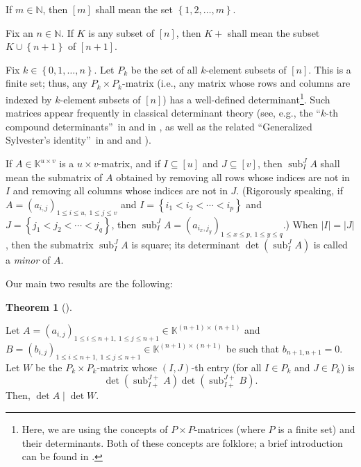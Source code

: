 \documentclass[numbers=enddot,12pt,final,onecolumn,notitlepage]{scrartcl}%
\theoremstyle{definition}
\newtheorem{theo}{Theorem}[section]
\newenvironment{theorem}[1][]
{\begin{theo}[#1]\begin{leftbar}}
{\end{leftbar}\end{theo}}
\begin{document}
If $m\in\mathbb{N}$, then $\left[  m\right]  $ shall mean the set $\left\{
1,2,\ldots,m\right\}  $.

Fix an $n\in\mathbb{N}$. If $K$ is any subset of $\left[  n\right]  $, then
$K+$ shall mean the subset $K\cup\left\{  n+1\right\}  $ of $\left[
n+1\right]  $.

Fix $k\in\left\{  0,1,\ldots,n\right\}  $. Let $P_{k}$ be the set of all
$k$-element subsets of $\left[  n\right]  $. This is a finite set; thus, any
$P_{k}\times P_{k}$-matrix (i.e., any matrix whose rows and columns are
indexed by $k$-element subsets of $\left[  n\right]  $) has a well-defined
determinant\footnote{Here, we are using the concepts of $P \times P$-matrices
(where $P$ is a finite set) and their determinants. Both of these concepts are
folklore; a brief introduction can be found in \cite[\S 1]{Grinbe18}.}. Such
matrices appear frequently in classical determinant theory (see, e.g., the
\textquotedblleft$k$-th compound determinants\textquotedblright\ in
\cite{MuiMet60} and in \cite[\S 2.6]{Prasolov}, as well as the related
\textquotedblleft Generalized Sylvester's identity\textquotedblright\ in
\cite[\S 2.7]{Prasolov} and \cite[Teorema 2.9.1]{Prasol15} and \cite{Mohr53}).

If $A\in\mathbb{K}^{u\times v}$ is a $u\times v$-matrix, and if $I\subseteq
\left[  u\right]  $ and $J\subseteq\left[  v\right]  $, then
$\operatorname*{sub}\nolimits_{I}^{J}A$ shall mean the submatrix of $A$
obtained by removing all rows whose indices are not in $I$ and removing all
columns whose indices are not in $J$. (Rigorously speaking, if $A=\left(
a_{i,j}\right)  _{1\leq i\leq u,\ 1\leq j\leq v}$ and $I=\left\{  i_{1}%
<i_{2}<\cdots<i_{p}\right\}  $ and $J=\left\{  j_{1}<j_{2}<\cdots
<j_{q}\right\}  $, then $\operatorname*{sub}\nolimits_{I}^{J}A=\left(
a_{i_{x},j_{y}}\right)  _{1\leq x\leq p,\ 1\leq y\leq q}$.) When $\left\vert
I\right\vert =\left\vert J\right\vert $, then the submatrix
$\operatorname*{sub}\nolimits_{I}^{J}A$ is square; its determinant
$\det\left(  \operatorname*{sub}\nolimits_{I}^{J}A\right)  $ is called a
\textit{minor} of $A$.

Our main two results are the following:


\begin{theorem}
\label{thm.bisyl.B0}Let $A=\left(  a_{i,j}\right)  _{1\leq i\leq n+1,\ 1\leq
j\leq n+1}\in\mathbb{K}^{\left(  n+1\right)  \times\left(  n+1\right)  }$ and
$B=\left(  b_{i,j}\right)  _{1\leq i\leq n+1,\ 1\leq j\leq n+1}\in
\mathbb{K}^{\left(  n+1\right)  \times\left(  n+1\right)  }$ be such that
$b_{n+1,n+1}=0$. Let $W$ be the $P_{k}\times P_{k}$-matrix whose $\left(
I,J\right)  $-th entry (for all $I\in P_{k}$ and $J\in P_{k}$) is%
\[
\det\left(  \operatorname*{sub}\nolimits_{I+}^{J+}A\right)  \det\left(
\operatorname*{sub}\nolimits_{I+}^{J+}B\right)  .
\]
Then, $\det A\mid\det W$.
\end{theorem}
\end{document}
